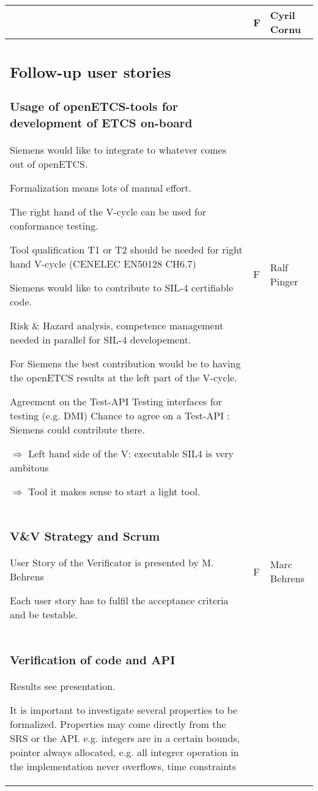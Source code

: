 \documentclass[a4paper]{article}
\begin{document}
\begin{longtable}{|p{}|p{}|p{}|}
& F
& Cyril Cornu
\\\hline
\subsection{Follow-up user stories}
\subsubsection{Usage of openETCS-tools for development of ETCS on-board} %

Siemens would like to integrate to whatever comes out of openETCS.

Formalization means lots of manual effort.

The right hand of the V-cycle can be used for conformance testing.

Tool qualification T1 or T2 should be needed for right hand V-cycle (CENELEC EN50128 CH6.7)

Siemens would like to contribute to SIL-4 certifiable code.

	Risk \& Hazard analysis, competence management needed in parallel for SIL-4 developement.

For Siemens the best contribution would be to having the openETCS results at the left part of the V-cycle.

Agreement on the Test-API
	Testing interfaces for testing (e.g. DMI)
	Chance to agree on a Test-API : Siemens could contribute there.


$\Rightarrow$ Left hand side of the V: executable SIL4 is very ambitous

$\Rightarrow$ Tool it makes sense to start a light tool.

& F
& Ralf Pinger
\\\hline
\subsubsection{V\&V Strategy and Scrum} %
User Story of the Verificator is presented by M. Behrens

Each user story has to fulfil the acceptance criteria and be testable.
& F
& Marc Behrens
\\\hline
\subsubsection{Verification of code and API} %

Results see presentation.

It is important to investigate several properties to be formalized.
Properties may come directly from the SRS or the API.
	e.g. integers are in a certain bounds, pointer always allocated, e.g. all integrer operation in the implementation never overflows, time constraints


\end{longtable}
\end{document}
